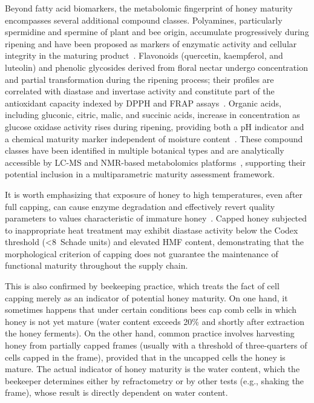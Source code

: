 \documentclass[foods,review,accept,pdftex,moreauthors]{Definitions/mdpi}
\begin{document}
{{Beyond fatty acid biomarkers, the metabolomic fingerprint of honey maturity encompasses several additional compound classes. Polyamines, particularly spermidine and spermine of plant and bee origin, accumulate progressively during ripening and have been proposed as markers of enzymatic activity and cellular integrity in the maturing product~\cite{guo2020,biochemreactions2022}. Flavonoids (quercetin, kaempferol, and luteolin) and phenolic glycosides derived from floral nectar undergo concentration and partial transformation during the ripening process; their profiles are correlated with diastase and invertase activity and constitute part of the antioxidant capacity indexed by DPPH and FRAP assays~\cite{guo2020}. Organic acids, including gluconic, citric, malic, and succinic acids, increase in concentration as glucose oxidase activity rises during ripening, providing both a pH indicator and a chemical maturity marker independent of moisture content~\cite{zhang2021,biochemreactions2022}. These compound classes have been identified in multiple botanical types and are analytically accessible by LC-MS and NMR-based metabolomics platforms~\cite{nmrhoney2023}, supporting their potential inclusion in a multiparametric maturity assessment framework.}

It is worth emphasizing that exposure of honey to high temperatures,
even after full capping, can cause enzyme degradation and effectively
revert quality parameters to values characteristic of immature
honey~\cite{biochemreactions2022}.
Capped honey subjected to inappropriate heat treatment may exhibit
diastase activity below the Codex threshold (<8~Schade units)
and elevated HMF content, demonstrating that the morphological
criterion of capping does not guarantee the maintenance of
functional maturity throughout the supply chain.

This is also confirmed by beekeeping practice, which treats the
fact of cell capping merely as an indicator of potential honey
maturity. On one hand, it sometimes happens that under certain
conditions bees cap comb cells in which honey is not yet mature
(water content exceeds 20\% and shortly after extraction the honey
ferments). On the other hand, common practice involves harvesting
honey from partially capped frames (usually with a threshold of
three-quarters of cells capped in the frame), provided that in
the uncapped cells the honey is mature. The actual indicator of
honey maturity is the water content, which the beekeeper determines
either by refractometry or by other tests (e.g., shaking the frame),
whose result is directly dependent on water content.

}
\end{document}
